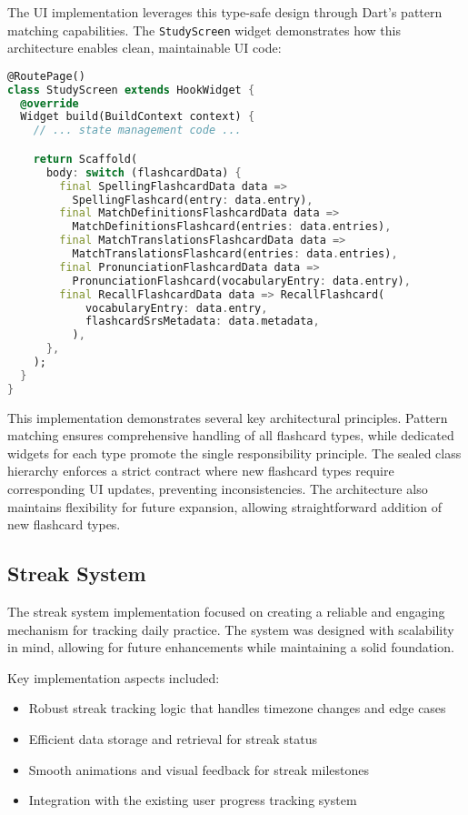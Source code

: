 The UI implementation leverages this type-safe design through Dart's pattern matching capabilities. The \texttt{StudyScreen} widget demonstrates how this architecture enables clean, maintainable UI code:

\begin{lstlisting}[language=Dart, caption={StudyScreen widget with pattern matching}, label=lst:study-screen]
@RoutePage()
class StudyScreen extends HookWidget {
  @override
  Widget build(BuildContext context) {
    // ... state management code ...

    return Scaffold(
      body: switch (flashcardData) {
        final SpellingFlashcardData data =>
          SpellingFlashcard(entry: data.entry),
        final MatchDefinitionsFlashcardData data =>
          MatchDefinitionsFlashcard(entries: data.entries),
        final MatchTranslationsFlashcardData data =>
          MatchTranslationsFlashcard(entries: data.entries),
        final PronunciationFlashcardData data =>
          PronunciationFlashcard(vocabularyEntry: data.entry),
        final RecallFlashcardData data => RecallFlashcard(
            vocabularyEntry: data.entry,
            flashcardSrsMetadata: data.metadata,
          ),
      },
    );
  }
}
\end{lstlisting}

This implementation demonstrates several key architectural principles. Pattern matching ensures comprehensive handling of all flashcard types, while dedicated widgets for each type promote the single responsibility principle. The sealed class hierarchy enforces a strict contract where new flashcard types require corresponding UI updates, preventing inconsistencies. The architecture also maintains flexibility for future expansion, allowing straightforward addition of new flashcard types.

\subsection{Streak System}

The streak system implementation focused on creating a reliable and engaging mechanism for tracking daily practice. The system was designed with scalability in mind, allowing for future enhancements while maintaining a solid foundation.

Key implementation aspects included:
\begin{itemize}
    \item Robust streak tracking logic that handles timezone changes and edge cases
    \item Efficient data storage and retrieval for streak status
    \item Smooth animations and visual feedback for streak milestones
    \item Integration with the existing user progress tracking system
\end{itemize}